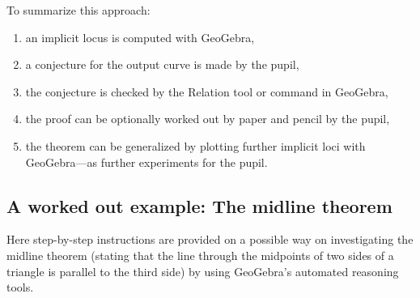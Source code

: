 \documentclass{article}
\begin{document}
To summarize this approach:
\begin{enumerate}
    \item an implicit locus is computed with GeoGebra,
    \item a conjecture for the output curve is made by the pupil,
    \item the conjecture is checked by the Relation tool or command in GeoGebra,
    \item the proof can be optionally worked out by paper and pencil by the pupil,
    \item the theorem can be generalized by plotting further implicit loci with GeoGebra---as further experiments for the pupil.
\end{enumerate}

\subsection{A worked out example: The midline theorem}

Here step-by-step instructions are provided on a possible way on investigating the midline theorem  (stating that the line through the midpoints of two sides of a triangle is parallel to the third side) by using GeoGebra's automated reasoning tools.
\end{document}
